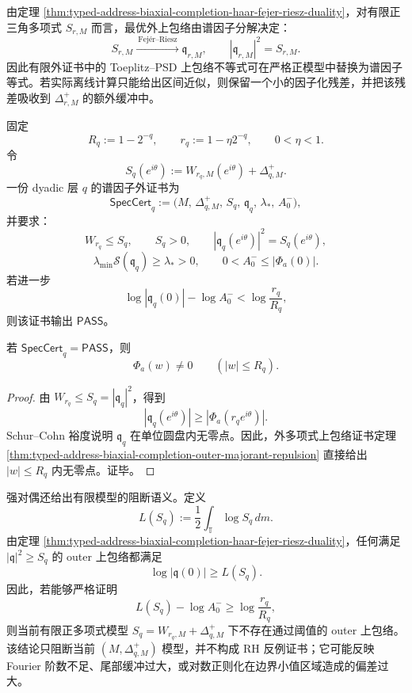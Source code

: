 由定理 \ref{thm:typed-address-biaxial-completion-haar-fejer-riesz-duality}，对有限正三角多项式 \(S_{r,M}\) 而言，最优外上包络由谱因子分解决定：
\[
S_{r,M}
\xrightarrow{\ \text{Fej\'er--Riesz}\ }
\mathfrak q_{r,M},
\qquad
|\mathfrak q_{r,M}|^2=S_{r,M}.
\]
因此有限外证书中的 Toeplitz--PSD 上包络不等式可在严格正模型中替换为谱因子等式。若实际离线计算只能给出区间近似，则保留一个小的因子化残差，并把该残差吸收到 \(\Delta_{r,M}^+\) 的额外缓冲中。

\begin{definition}[谱因子外证书]\label{def:typed-address-biaxial-completion-spectral-factor-outer-certificate}
固定
\[
R_q:=1-2^{-q},
\qquad
r_q:=1-\eta2^{-q},
\qquad
0<\eta<1.
\]
令
\[
S_q(e^{i\theta})
:=
W_{r_q,M}(e^{i\theta})+\Delta_{q,M}^+.
\]
一份 dyadic 层 \(q\) 的谱因子外证书为
\[
\mathsf{SpecCert}_q
:=
\bigl(
M,\,
\Delta_{q,M}^+,\,S_q,\,
\mathfrak q_q,\,
\lambda_*,\,
A_0^-
\bigr),
\]
并要求：
\[
W_{r_q}\le S_q,\qquad
S_q>0,\qquad
|\mathfrak q_q(e^{i\theta})|^2=S_q(e^{i\theta}),
\]
\[
\lambda_{\min}\mathcal S(\mathfrak q_q)\ge\lambda_*>0,
\qquad
0<A_0^-\le|\Phi_a(0)|.
\]
若进一步
\[
\log|\mathfrak q_q(0)|-\log A_0^-
<
\log\frac{r_q}{R_q},
\]
则该证书输出 \(\mathsf{PASS}\)。
\end{definition}

\begin{corollary}[谱因子证书的正确性]\label{cor:typed-address-biaxial-completion-spectral-factor-certificate-soundness}
若 \(\mathsf{SpecCert}_q=\mathsf{PASS}\)，则
\[
\Phi_a(w)\ne0
\qquad
(|w|\le R_q).
\]
\end{corollary}
\begin{proof}
由 \(W_{r_q}\le S_q=|\mathfrak q_q|^2\)，得到
\[
|\mathfrak q_q(e^{i\theta})|
\ge
|\Phi_a(r_qe^{i\theta})|.
\]
Schur--Cohn 裕度说明 \(\mathfrak q_q\) 在单位圆盘内无零点。因此，外多项式上包络证书定理 \ref{thm:typed-address-biaxial-completion-outer-majorant-repulsion} 直接给出 \(|w|\le R_q\) 内无零点。证毕。
\end{proof}

强对偶还给出有限模型的阻断语义。定义
\[
L(S_q)
:=
\frac12\int_{\mathbb T}\log S_q\,dm.
\]
由定理 \ref{thm:typed-address-biaxial-completion-haar-fejer-riesz-duality}，任何满足 \(|\mathfrak q|^2\ge S_q\) 的 outer 上包络都满足
\[
\log|\mathfrak q(0)|\ge L(S_q).
\]
因此，若能够严格证明
\[
L(S_q)-\log A_0^-
\ge
\log\frac{r_q}{R_q},
\]
则当前有限正多项式模型 \(S_q=W_{r_q,M}+\Delta_{q,M}^+\) 下不存在通过阈值的 outer 上包络。该结论只阻断当前 \((M,\Delta_{q,M}^+)\) 模型，并不构成 RH 反例证书；它可能反映 Fourier 阶数不足、尾部缓冲过大，或对数正则化在边界小值区域造成的偏差过大。

